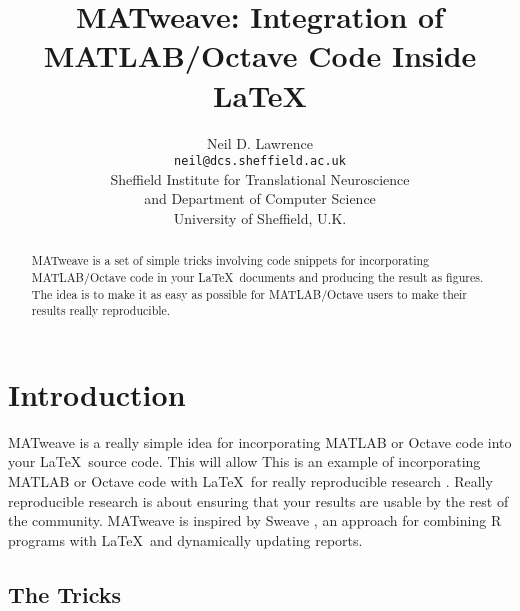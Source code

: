 \documentclass{article}
\title{MATweave: Integration of MATLAB/Octave Code Inside \LaTeX}
\author{Neil D. Lawrence\\\texttt{neil@dcs.sheffield.ac.uk}\\Sheffield Institute for Translational Neuroscience\\and Department of Computer Science\\University of Sheffield, U.K.}
\date{} %
\begin{document}
\maketitle


\begin{abstract}
  MATweave is a set of simple tricks involving code snippets for
  incorporating MATLAB/Octave code in your \LaTeX\ documents and
  producing the result as figures. The idea is to make it as easy as
  possible for MATLAB/Octave users to make their results really
  reproducible.
\end{abstract}

\section{Introduction}

MATweave is a really simple idea for incorporating MATLAB or Octave
code into your \LaTeX\ source code. This will allow This is an example
of incorporating MATLAB or Octave code with \LaTeX\ for really
reproducible research
\citep{Buckheit:wavelab95,Schab:reproducible00}. Really reproducible
research is about ensuring that your results are usable by the rest of
the community. MATweave is inspired by Sweave \citep{Leisch:sweave02},
an approach for combining R programs with \LaTeX\ and dynamically
updating reports.

\subsection{The Tricks}
\end{document}
